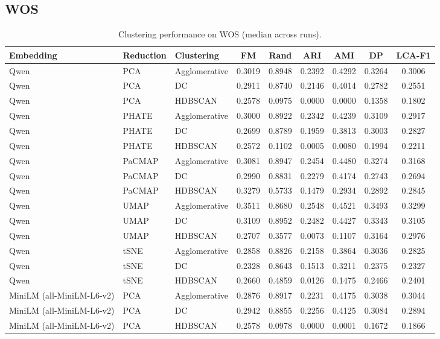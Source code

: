 \subsection{WOS}
\begin{table}[t]
\centering
\caption{Clustering performance on WOS (median across runs).}
\begin{tabular}{lllcccccc}
\toprule
Embedding & Reduction & Clustering & FM & Rand & ARI & AMI & DP & LCA-F1 \\
\midrule

Qwen & PCA & Agglomerative & 0.3019 & 0.8948 & 0.2392 & 0.4292 & 0.3264 & 0.3006 \\
Qwen & PCA & DC & 0.2911 & 0.8740 & 0.2146 & 0.4014 & 0.2782 & 0.2551 \\
Qwen & PCA & HDBSCAN & 0.2578 & 0.0975 & 0.0000 & 0.0000 & 0.1358 & 0.1802 \\

Qwen & PHATE & Agglomerative & 0.3000 & 0.8922 & 0.2342 & 0.4239 & 0.3109 & 0.2917 \\
Qwen & PHATE & DC & 0.2699 & 0.8789 & 0.1959 & 0.3813 & 0.3003 & 0.2827 \\
Qwen & PHATE & HDBSCAN & 0.2572 & 0.1102 & 0.0005 & 0.0080 & 0.1994 & 0.2211 \\

Qwen & PaCMAP & Agglomerative & 0.3081 & 0.8947 & 0.2454 & 0.4480 & 0.3274 & 0.3168 \\
Qwen & PaCMAP & DC & 0.2990 & 0.8831 & 0.2279 & 0.4174 & 0.2743 & 0.2694 \\
Qwen & PaCMAP & HDBSCAN & 0.3279 & 0.5733 & 0.1479 & 0.2934 & 0.2892 & 0.2845 \\

Qwen & UMAP & Agglomerative & 0.3511 & 0.8680 & 0.2548 & 0.4521 & 0.3493 & 0.3299 \\
Qwen & UMAP & DC & 0.3109 & 0.8952 & 0.2482 & 0.4427 & 0.3343 & 0.3105 \\
Qwen & UMAP & HDBSCAN & 0.2707 & 0.3577 & 0.0073 & 0.1107 & 0.3164 & 0.2976 \\

Qwen & tSNE & Agglomerative & 0.2858 & 0.8826 & 0.2158 & 0.3864 & 0.3036 & 0.2825 \\
Qwen & tSNE & DC & 0.2328 & 0.8643 & 0.1513 & 0.3211 & 0.2375 & 0.2327 \\
Qwen & tSNE & HDBSCAN & 0.2660 & 0.4859 & 0.0126 & 0.1475 & 0.2466 & 0.2401 \\

MiniLM (all-MiniLM-L6-v2) & PCA & Agglomerative & 0.2876 & 0.8917 & 0.2231 & 0.4175 & 0.3038 & 0.3044 \\
MiniLM (all-MiniLM-L6-v2) & PCA & DC & 0.2942 & 0.8855 & 0.2256 & 0.4125 & 0.3084 & 0.2894 \\
MiniLM (all-MiniLM-L6-v2) & PCA & HDBSCAN & 0.2578 & 0.0978 & 0.0000 & 0.0001 & 0.1672 & 0.1866 \\


\end{tabular}
\end{table}

